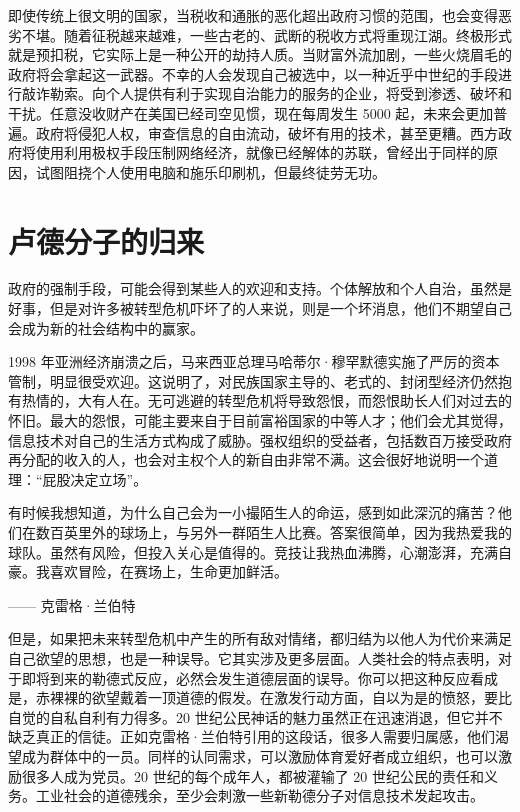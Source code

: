 即使传统上很文明的国家，当税收和通胀的恶化超出政府习惯的范围，也会变得恶劣不堪。随着征税越来越难，一些古老的、武断的税收方式将重现江湖。终极形式就是预扣税，它实际上是一种公开的劫持人质。当财富外流加剧，一些火烧眉毛的政府将会拿起这一武器。不幸的人会发现自己被选中，以一种近乎中世纪的手段进行敲诈勒索。向个人提供有利于实现自治能力的服务的企业，将受到渗透、破坏和干扰。任意没收财产在美国已经司空见惯，现在每周发生 5000 起，未来会更加普遍。政府将侵犯人权，审查信息的自由流动，破坏有用的技术，甚至更糟。西方政府将使用利用极权手段压制网络经济，就像已经解体的苏联，曾经出于同样的原因，试图阻挠个人使用电脑和施乐印刷机，但最终徒劳无功。



\section{卢德分子的归来}
政府的强制手段，可能会得到某些人的欢迎和支持。个体解放和个人自治，虽然是好事，但是对许多被转型危机吓坏了的人来说，则是一个坏消息，他们不期望自己会成为新的社会结构中的赢家。


1998 年亚洲经济崩溃之后，马来西亚总理马哈蒂尔·穆罕默德实施了严厉的资本管制，明显很受欢迎。这说明了，对民族国家主导的、老式的、封闭型经济仍然抱有热情的，大有人在。无可逃避的转型危机将导致怨恨，而怨恨助长人们对过去的怀旧。最大的怨恨，可能主要来自于目前富裕国家的中等人才；他们会尤其觉得，信息技术对自己的生活方式构成了威胁。强权组织的受益者，包括数百万接受政府再分配的收入的人，也会对主权个人的新自由非常不满。这会很好地说明一个道理：“屁股决定立场”。



\begin{tcolorbox}
有时候我想知道，为什么自己会为一小撮陌生人的命运，感到如此深沉的痛苦？他们在数百英里外的球场上，与另外一群陌生人比赛。答案很简单，因为我热爱我的球队。虽然有风险，但投入关心是值得的。竞技让我热血沸腾，心潮澎湃，充满自豪。我喜欢冒险，在赛场上，生命更加鲜活。
\begin{flushright}
—— 克雷格·兰伯特
\end{flushright}
\end{tcolorbox}

但是，如果把未来转型危机中产生的所有敌对情绪，都归结为以他人为代价来满足自己欲望的思想，也是一种误导。它其实涉及更多层面。人类社会的特点表明，对于即将到来的勒德式反应，必然会发生道德层面的误导。你可以把这种反应看成是，赤裸裸的欲望戴着一顶道德的假发。在激发行动方面，自以为是的愤怒，要比自觉的自私自利有力得多。20 世纪公民神话的魅力虽然正在迅速消退，但它并不缺乏真正的信徒。正如克雷格·兰伯特引用的这段话，很多人需要归属感，他们渴望成为群体中的一员。同样的认同需求，可以激励体育爱好者成立组织，也可以激励很多人成为党员。20 世纪的每个成年人，都被灌输了 20 世纪公民的责任和义务。工业社会的道德残余，至少会刺激一些新勒德分子对信息技术发起攻击。


